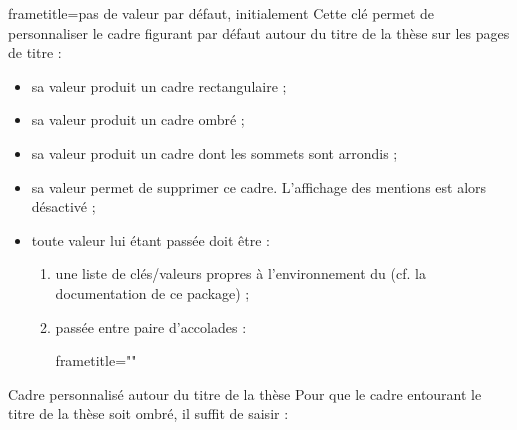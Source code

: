 {%
\begin{docKey}{frametitle}{=\textbar{}\textbar{}\textbar{}\textbar{}}{pas de valeur par défaut, initialement }
  Cette clé permet de personnaliser le cadre figurant par défaut autour du
  titre de la thèse sur les pages de titre :
  \begin{itemize}
  \item sa valeur  produit un cadre rectangulaire ;
  \item sa valeur  produit un cadre ombré ;
  \item sa valeur  produit un cadre dont les sommets sont
    arrondis ;
  \item sa valeur  permet de supprimer ce cadre. L'affichage des
    mentions  est alors désactivé ;
  \item toute  valeur lui étant passée doit être :
    \begin{enumerate}
    \item une liste de clés/valeurs propres à l'environnement
       du  (cf. la
      documentation de ce package) ;
    \item passée entre paire d'accolades :
\begin{preamblecode}
frametitle={""}
\end{preamblecode}
    \end{enumerate}
  \end{itemize}
\end{docKey}
}

\begin{dbexample}{Cadre personnalisé autour du titre de la thèse}{}
  Pour que le cadre entourant le titre de la thèse soit ombré, il suffit de
  saisir :
\begin{preamblecode}
\maketitle[frametitle=shadowbox]
\end{preamblecode}
\end{dbexample}

